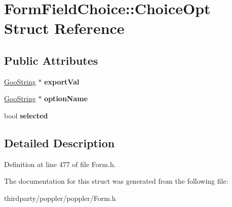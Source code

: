 \hypertarget{struct_form_field_choice_1_1_choice_opt}{}\section{Form\+Field\+Choice\+:\+:Choice\+Opt Struct Reference}
\label{struct_form_field_choice_1_1_choice_opt}
\subsection*{Public Attributes}
\begin{DoxyCompactItemize}
\item 
\mbox{\label{struct_form_field_choice_1_1_choice_opt_ad7c4228f00d983ff47548ecab621bec4}} 
\hyperlink{class_goo_string}{Goo\+String} $\ast$ {\bfseries export\+Val}
\item 
\mbox{\label{struct_form_field_choice_1_1_choice_opt_a98fc7660c3681eb497a2cfeaa0bd4f9f}} 
\hyperlink{class_goo_string}{Goo\+String} $\ast$ {\bfseries option\+Name}
\item 
\mbox{\label{struct_form_field_choice_1_1_choice_opt_ad3abc6335b85cbf4e3ef2c8cf25e7575}} 
bool {\bfseries selected}
\end{DoxyCompactItemize}


\subsection{Detailed Description}


Definition at line 477 of file Form.\+h.



The documentation for this struct was generated from the following file\+:\begin{DoxyCompactItemize}
\item 
thirdparty/poppler/poppler/Form.\+h\end{DoxyCompactItemize}
